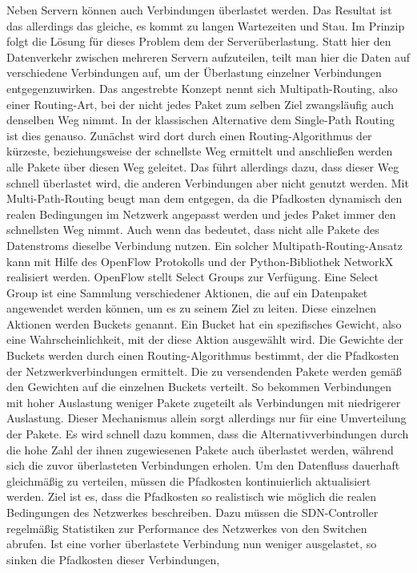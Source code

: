 Neben Servern können auch Verbindungen überlastet werden. Das Resultat ist das allerdings das gleiche, es kommt zu langen Wartezeiten und Stau. Im Prinzip folgt die Lösung für dieses Problem dem der Serverüberlastung. 
Statt hier den Datenverkehr zwischen mehreren Servern aufzuteilen, teilt man hier die Daten auf verschiedene Verbindungen auf, um der Überlastung einzelner Verbindungen entgegenzuwirken. 
Das angestrebte Konzept nennt sich Multipath-Routing, also einer Routing-Art, bei der nicht jedes Paket zum selben Ziel zwangsläufig auch denselben Weg nimmt. 
In der klassischen Alternative dem Single-Path Routing ist dies genauso. Zunächst wird dort durch einen Routing-Algorithmus der kürzeste, 
beziehungsweise der schnellste Weg ermittelt und anschließen werden alle Pakete über diesen Weg geleitet. Das führt allerdings dazu, dass dieser Weg schnell überlastet wird, die anderen Verbindungen aber nicht genutzt werden. 
Mit Multi-Path-Routing beugt man dem entgegen, da die Pfadkosten dynamisch den realen Bedingungen im Netzwerk angepasst werden und jedes Paket immer den schnellsten Weg nimmt. Auch wenn das bedeutet, 
dass nicht alle Pakete des Datenstroms dieselbe Verbindung nutzen. Ein solcher Multipath-Routing-Ansatz kann mit Hilfe des OpenFlow Protokolls und der Python-Bibliothek NetworkX realisiert werden. 
OpenFlow stellt Select Groups zur Verfügung. Eine Select Group ist eine Sammlung verschiedener Aktionen, die auf ein Datenpaket angewendet werden können, um es zu seinem Ziel zu leiten. 
Diese einzelnen Aktionen werden Buckets genannt. Ein Bucket hat ein spezifisches Gewicht, also eine Wahrscheinlichkeit, mit der diese Aktion ausgewählt wird. 
Die Gewichte der Buckets werden durch einen Routing-Algorithmus bestimmt, der die Pfadkosten der Netzwerkverbindungen ermittelt. Die zu versendenden Pakete werden gemäß den Gewichten auf die einzelnen Buckets verteilt. 
So bekommen Verbindungen mit hoher Auslastung weniger Pakete zugeteilt als Verbindungen mit niedrigerer Auslastung. Dieser Mechanismus allein sorgt allerdings nur für eine Umverteilung der Pakete. 
Es wird schnell dazu kommen, dass die Alternativverbindungen durch die hohe Zahl der ihnen zugewiesenen Pakete auch überlastet werden, während sich die zuvor überlasteten Verbindungen erholen. 
Um den Datenfluss dauerhaft gleichmäßig zu verteilen, müssen die Pfadkosten kontinuierlich aktualisiert werden. Ziel ist es, dass die Pfadkosten so realistisch wie möglich die realen Bedingungen des Netzwerkes beschreiben. 
Dazu müssen die SDN-Controller regelmäßig Statistiken zur Performance des Netzwerkes von den Switchen abrufen. Ist eine vorher überlastete Verbindung nun weniger ausgelastet, so sinken die Pfadkosten dieser Verbindungen, 
